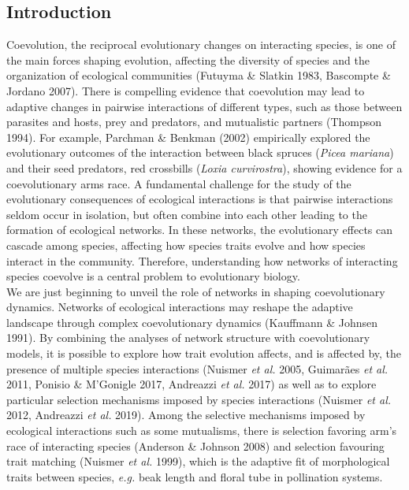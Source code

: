 \documentclass[a4paper, 12pt]{article}
\begin{document}
\subsection*{Introduction}
Coevolution, the reciprocal evolutionary changes on interacting species, is one of the main forces shaping  evolution, affecting the diversity of species and the organization of ecological communities (Futuyma \& Slatkin 1983, Bascompte \& Jordano 2007). There is compelling evidence that coevolution may lead to adaptive changes in pairwise interactions of different types, such as those between parasites and hosts, prey and predators, and mutualistic partners (Thompson 1994). For example, Parchman \& Benkman (2002) empirically explored the evolutionary outcomes of the interaction between black spruces (\textit{Picea mariana}) and their seed predators, red crossbills (\textit{Loxia curvirostra}), showing evidence for a coevolutionary arms race. A fundamental challenge for the study of the evolutionary consequences of ecological interactions is that pairwise interactions seldom occur in isolation, but often combine into each other leading to the formation of ecological networks. In these networks, the evolutionary effects can cascade among species, affecting how species traits evolve and how species interact in the community. Therefore, understanding how networks of interacting species coevolve is a central problem to evolutionary biology.\\
We are just beginning to unveil the role of networks in shaping coevolutionary dynamics. Networks of ecological interactions may reshape the adaptive landscape through complex coevolutionary dynamics (Kauffmann \& Johnsen 1991). By combining the analyses of network structure with coevolutionary models, it is possible to explore how trait evolution affects, and is affected by, the presence of multiple species interactions (Nuismer \textit{et al.} 2005, Guimarães \textit{et al.} 2011, Ponisio \& M'Gonigle 2017, Andreazzi \textit{et al.} 2017) as well as to explore particular selection mechanisms imposed by species interactions (Nuismer \textit{et al.} 2012, Andreazzi \textit{et al.} 2019). Among the selective mechanisms imposed by ecological interactions such as some mutualisms, there is selection favoring arm's race of interacting species (Anderson \& Johnson 2008) and selection favouring trait matching (Nuismer \textit{et al.} 1999), which is the adaptive fit of morphological traits between species, \textit{e.g.} beak length and floral tube in pollination systems.\\
\end{document}
